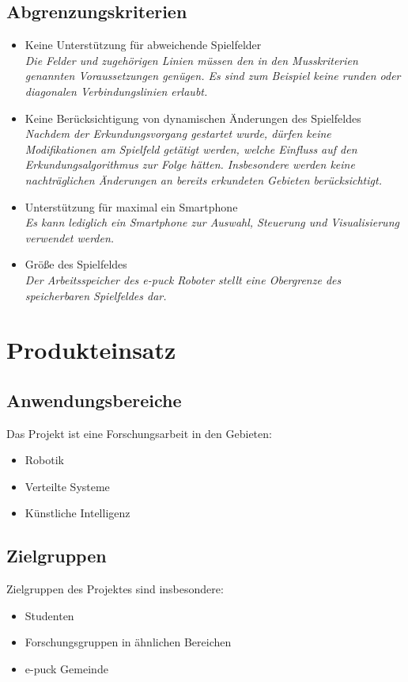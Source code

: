 \documentclass[10pt,a4paper]{article}
\let\oldsection\section
\renewcommand{\section}{\newpage \oldsection}
\begin{document}
		\subsection{Abgrenzungskriterien}
			\begin{itemize}
				\item Keine Unterstützung für abweichende Spielfelder
					\\ \textsl{Die Felder und zugehörigen Linien müssen den in den Musskriterien genannten Voraussetzungen
						genügen. Es sind zum Beispiel keine runden oder diagonalen Verbindungslinien erlaubt.}
				\item Keine Berücksichtigung von dynamischen Änderungen des Spielfeldes
					\\ \textsl{Nachdem der Erkundungsvorgang gestartet wurde, dürfen keine Modifikationen am
						Spielfeld getätigt werden, welche Einfluss auf den Erkundungsalgorithmus zur Folge hätten.
						Insbesondere werden keine nachträglichen Änderungen an bereits erkundeten Gebieten berücksichtigt.}			
				\item Unterstützung für maximal ein Smartphone
					\\ \textsl{Es kann lediglich ein Smartphone zur Auswahl, Steuerung und Visualisierung verwendet
						werden.}	
				\item Größe des Spielfeldes
					\\ \textsl{Der Arbeitsspeicher des e-puck Roboter stellt eine Obergrenze des speicherbaren Spielfeldes dar. }							
			\end{itemize}
	\section{Produkteinsatz}
		\subsection{Anwendungsbereiche}
			Das Projekt ist eine Forschungsarbeit in den Gebieten:
			\begin{itemize}
				\item Robotik
				\item Verteilte Systeme
				\item Künstliche Intelligenz
			\end{itemize}
		\subsection{Zielgruppen}
			Zielgruppen des Projektes sind insbesondere: 
			\begin{itemize}
				\item Studenten
				\item Forschungsgruppen in ähnlichen Bereichen
				\item e-puck Gemeinde
			\end{itemize}
\end{document}
